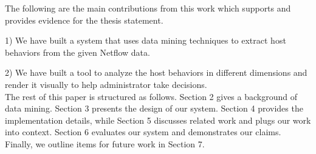 The following are the main contributions from this work which supports and provides evidence for the thesis statement.

1) We have built a system that uses data mining techniques to extract host behaviors from the given Netflow data.

2) We have built a tool to analyze the host behaviors in different dimensions and render it visually to help administrator take decisions.\\


The rest of this paper is structured as follows. Section 2 gives a background of data mining. Section 3 presents the design of our system. Section 4 provides the implementation details, while Section 5 discusses related work and plugs our work into context. Section 6 evaluates our system  and demonstrates our claims. Finally, we outline items for future work in Section 7.
